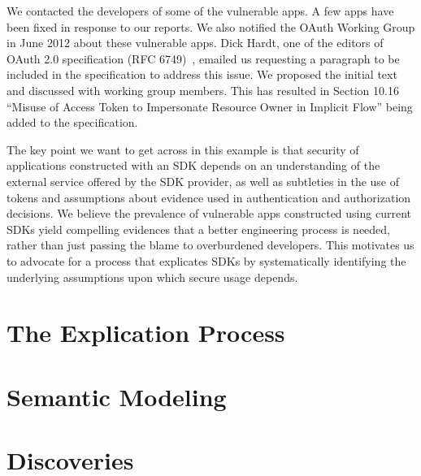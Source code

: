 We contacted the developers of some of the vulnerable apps. A few apps have been fixed in response to our reports.  We also notified the OAuth Working Group in June 2012 about these vulnerable apps.  Dick Hardt, one of the editors of OAuth 2.0 specification (RFC 6749)~\cite{OAuth2.0}, emailed us requesting a paragraph to be included in the specification to address this issue.  We proposed the initial text and discussed with working group members.  This has resulted in Section 10.16 ``Misuse of Access Token to Impersonate Resource Owner in Implicit Flow'' being added to the specification.

The key point we want to get across in this example is that security of applications constructed with an SDK depends on an understanding of the external service offered by the SDK provider, as well as subtleties in the use of tokens and assumptions about evidence used in authentication and authorization decisions.  We believe the prevalence of vulnerable apps constructed using current SDKs yield compelling evidences that a better engineering process is needed, rather than just passing the blame to overburdened developers.  This motivates us to advocate for a process that explicates SDKs by systematically identifying the underlying assumptions upon which secure usage depends.

\section{The Explication Process}
\label{sec:explicating_explication_process}
\section{Semantic Modeling}
\label{sec:explicating_semantic_modeling}
\section{Discoveries}
\label{sec:explicating_discoveries}

